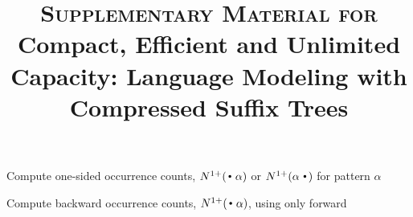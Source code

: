 \documentclass[11pt,a4paper]{article}
\title{\textsc{Supplementary Material for} \\
Compact, Efficient and Unlimited Capacity:
    Language Modeling with Compressed Suffix Trees}
\date{}
\begin{document}
\maketitle

\begin{algorithm}[htpb]
  \caption{Compute one-sided occurrence counts, $\nlplus{\dotpat}$ or $\nlplus{\patdot}$ for pattern $\alpha$ 
    \label{alg:n1plus}}
  \begin{algorithmic}[1]
        \EndIf
      \State {}
    \EndFunction
  \end{algorithmic}
\label{alg-nlplus}
\end{algorithm}


\begin{algorithm*}[htpb]
  \caption{Compute backward occurrence counts, $\nlplus{\dotpat}$, using only forward \CST 
    \label{alg:n1plusback_wt}}
  \begin{algorithmic}[1]
    \State {}
    \EndFunction
  \end{algorithmic}
\end{algorithm*}
\end{document}
